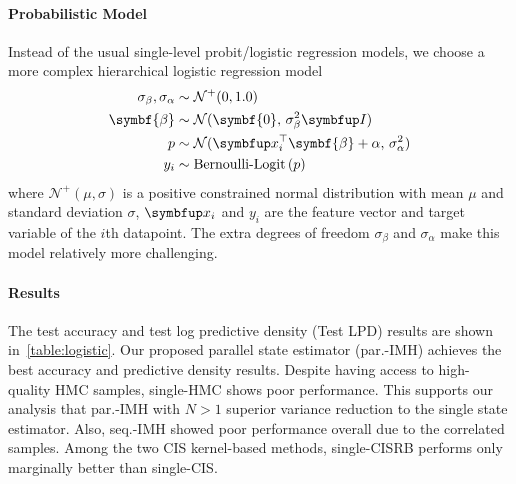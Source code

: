 
%

\vspace{-0.1in}
\paragraph{Probabilistic Model}
Instead of the usual single-level probit/logistic regression models, we choose a more complex hierarchical logistic regression model 
%
\begin{align*}
\sigma_{\beta}, \sigma_{\alpha} &\sim \mathcal{N}^{+}(0, 1.0) \\
\symbf{\beta} &\sim \mathcal{N}(\symbf{0},\, \sigma_{\beta}^2 \mI) \\
p &\sim \mathcal{N}(\vx_i^{\top}\symbf{\beta} + \alpha,\, \sigma_{\alpha}^2) \\
y_i &\sim \text{Bernoulli-Logit}\,(p)
\end{align*}
%
where \(\mathcal{N}^+(\mu, \sigma)\) is a positive constrained normal distribution with mean \(\mu\) and standard deviation \(\sigma\), \(\vx_i\) and \(y_i\) are the feature vector and target variable of the \(i\)th datapoint.
The extra degrees of freedom \(\sigma_{\beta}\) and \(\sigma_{\alpha}\) make this model relatively more challenging.

\vspace{-0.05in}
\paragraph{Results}
The test accuracy and test log predictive density (Test LPD) results are shown in~\cref{table:logistic}.
Our proposed parallel state estimator (par.-IMH) achieves the best accuracy and predictive density results.
Despite having access to high-quality HMC samples, single-HMC shows poor performance.
This supports our analysis that par.-IMH with \(N > 1\) superior variance reduction to the single state estimator.
Also, seq.-IMH showed poor performance overall due to the correlated samples.
Among the two CIS kernel-based methods, single-CISRB performs only marginally better than single-CIS.

